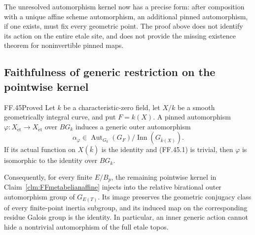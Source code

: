 The unresolved automorphism kernel
now has a precise form: after
composition with a unique affine
scheme automorphism, an additional
pinned automorphism, if one exists,
must fix every geometric point.
The proof above does not identify
its action on the entire etale
site, and does not provide the
missing existence theorem for
noninvertible pinned maps.


\subsection{Faithfulness of generic restriction on the pointwise kernel}

\begin{claim}{FF.45}{Proved}\label{clm:FFgenerickernel}
Let \(k\) be a characteristic-zero field, let \(X/k\)
be a smooth geometrically integral curve, and put
\(F=k(X)\). A pinned automorphism
\(\varphi:X_{\mathrm{\acute et}}\to
X_{\mathrm{\acute et}}\) over \(BG_k\) induces a generic
outer automorphism
\[
 \alpha_\varphi\in
 \operatorname{Aut}_{G_k}(G_F)/
              \operatorname{Inn}(G_{\bar k(X)}).
                                                        \tag{FF.45.1}
\]
If its actual function on \(X(\bar k)\) is the identity
and (FF.45.1) is trivial, then \(\varphi\) is isomorphic
to the identity over \(BG_k\).

Consequently, for every finite \(E/B_p\), the remaining
pointwise kernel in Claim~\ref{clm:FFmetabelianaffine}
injects into the relative birational outer automorphism
group of \(G_{E(T)}\). Its image preserves the geometric
conjugacy class of every finite-point inertia subgroup,
and its induced map on the corresponding residue Galois
group is the identity. In particular, an inner generic
action cannot hide a nontrivial automorphism of the full
etale topos.
\end{claim}

